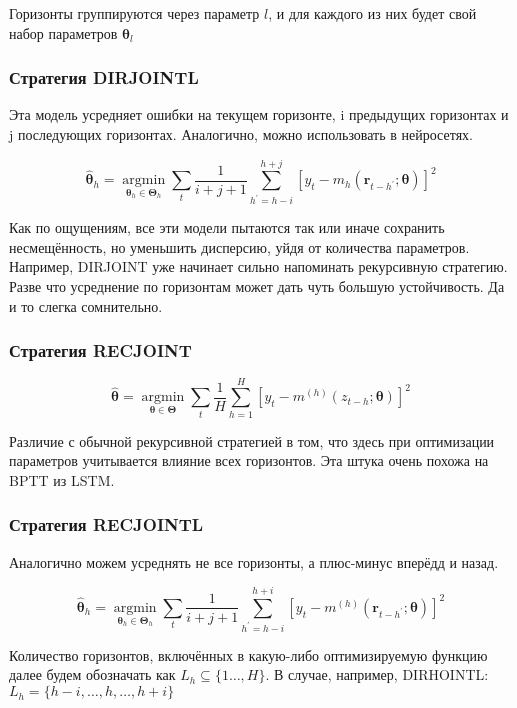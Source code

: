 \documentclass[a4paper,12pt]{article}
\begin{document}
Горизонты группируются через параметр $ l $, и для каждого из них будет свой набор параметров $ \boldsymbol{\theta}_{l} $

\subsubsection{Стратегия DIRJOINTL}

Эта модель усредняет ошибки на текущем горизонте, i предыдущих горизонтах и j последующих горизонтах.  Аналогично, можно использовать в нейросетях. 

\[
\hat{\boldsymbol{\theta}}_{h}=\underset{\boldsymbol{\theta}_{h} \in \boldsymbol{\Theta}_{h}}{\operatorname{argmin}} \sum_{t} \frac{1}{i+j+1} \sum_{h^{\prime}=h-i}^{h+j}\left[y_{t}-m_{h}\left(\boldsymbol{r}_{t-h^{\prime}} ; \boldsymbol{\theta}\right)\right]^{2}
\]

Как по ощущениям, все эти модели пытаются так или иначе сохранить несмещённость, но уменьшить дисперсию, уйдя от количества параметров. Например, DIRJOINT уже начинает сильно напоминать рекурсивную стратегию. Разве что усреднение по горизонтам может дать чуть большую устойчивость. Да и то слегка сомнительно.

\subsubsection{Стратегия RECJOINT}
\[
\hat{\boldsymbol{\theta}}=\underset{\boldsymbol{\theta} \in \boldsymbol{\Theta}}{\operatorname{argmin}} \sum_{t} \frac{1}{H} \sum_{h=1}^{H}\left[y_{t}-m^{(h)}\left(z_{t-h} ; \boldsymbol{\theta}\right)\right]^{2}
\]

Различие с обычной рекурсивной стратегией в том, что здесь при оптимизации параметров учитывается влияние всех горизонтов. Эта штука очень похожа на BPTT из LSTM.

\subsubsection{Стратегия RECJOINTL}

Аналогично можем усреднять не все горизонты, а плюс-минус вперёдд и назад.

\[
\hat{\boldsymbol{\theta}}_{h}=\underset{\boldsymbol{\theta}_{h} \in \boldsymbol{\Theta}_{h}}{\operatorname{argmin}} \sum_{t} \frac{1}{i+j+1} \sum_{h^{\prime}=h-i}^{h+i}\left[y_{t}-m^{(h)}\left(\boldsymbol{r}_{t-h^{\prime}} ; \boldsymbol{\theta}\right)\right]^{2}
\]

Количество горизонтов, включённых в какую-либо оптимизируемую функцию далее будем обозначать как $L_{h} \subseteq\{1 \ldots, H\}$. В случае, например, DIRHOINTL: $L_{h}=\{h-i, \ldots, h, \ldots, h+i\}$
\end{document}
